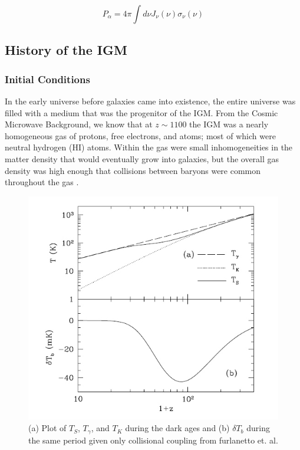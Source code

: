 \begin{equation}\label{Eq:pa}
P_{\alpha} = 4 \pi \int d\nu J_{\nu}(\nu) \sigma_{\nu}(\nu)
\end{equation}


\subsection{History of the IGM} \label{Sec:IGMhist}

\subsubsection{Initial Conditions}
In the early universe before galaxies came into existence, the entire universe was filled with a medium that was the progenitor of the IGM. From the Cosmic Microwave Background, we know that at $z \sim 1100$ the IGM was a nearly homogeneous gas of protons, free electrons, and atoms; most of which were neutral hydrogen (HI) atoms. Within the gas were small inhomogeneities in the matter density that would eventually grow into galaxies, but the overall gas density was high enough that collisions between baryons were common throughout the gas \cite{furlanetto_2006}. 

\begin{figure}[htb]
\begin{center}
\includegraphics[width=0.95\linewidth]{Introduction/figures/dark_ages_global_spectrum.jpg}
\caption{(a) Plot of $T_S$, $T_\gamma$, and $T_K$ during the dark ages and (b) $\delta T_b$ during the same period given only collisional coupling from furlanetto et. al. \cite{furlanetto_2006}}
\label{Fig:da_global}
\end{center}
\end{figure}

